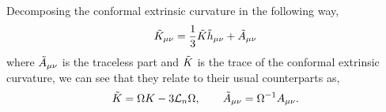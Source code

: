 Decomposing the conformal extrinsic curvature in the following way,
\begin{equation}
    \Tilde{K}_{\mu\nu}=\frac{1}{3}\Tilde{K}\Tilde{h}_{\mu\nu}+\Tilde{A}_{\mu\nu}
\end{equation}
where $\Tilde{A}_{\mu\nu}$ is the traceless part and $\Tilde{K}$ is the trace of the conformal extrinsic curvature, we can see that they relate to their usual counterparts as,
\begin{equation}
    \Tilde{K}=\Omega K-3\mathcal{L}_n\Omega, \qquad \Tilde{A}_{\mu\nu}=\Omega^{-1}A_{\mu\nu}.
\end{equation}



